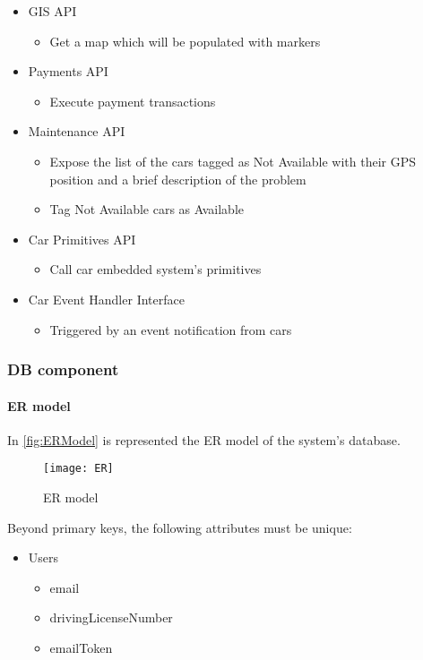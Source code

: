 \begin{itemize}
	\item GIS API
	\begin{itemize}
		\item Get a map which will be populated with markers
	\end{itemize}
	
	\item Payments API
	\begin{itemize}
		\item Execute payment transactions
	\end{itemize}
	
	\item Maintenance API
	\begin{itemize}
		\item Expose the list of the cars tagged as Not Available with their GPS position and a brief description of the problem
		\item Tag Not Available cars as Available
	\end{itemize}
	
	\item Car Primitives API
	\begin{itemize}
		\item Call car embedded system's primitives
	\end{itemize}
	
	\item Car Event Handler Interface 
	\begin{itemize}
		\item Triggered by an event notification from cars
	\end{itemize}
\end{itemize}
\clearpage

\subsubsection{DB component}
\paragraph{ER model}In \autoref{fig:ERModel} is represented the ER model of the system's database.

\begin{figure}[h!]
	\centering
	\texttt{[image: ER]}
	\caption{
		\label{fig:ERModel} 
		ER model
	}
\end{figure}
Beyond primary keys, the following attributes must be unique:
\begin{itemize}
	\item Users
	\begin{itemize}
		\item email
		\item drivingLicenseNumber
		\item emailToken
	\end{itemize}
\end{itemize}

